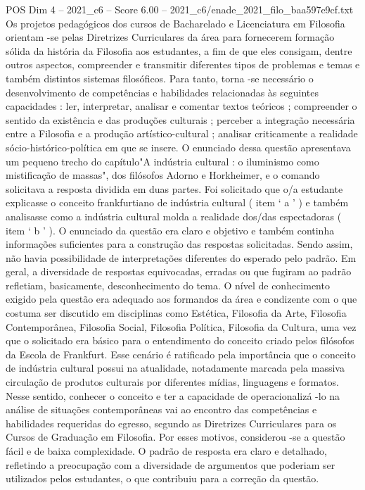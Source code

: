 \begin{textsample}{POS Dim 4 – 2021\_c6 – Score 6.00 – 2021\_c6/enade\_2021\_filo\_baa597e9cf.txt}
Os projetos pedagógicos dos cursos de Bacharelado e Licenciatura em Filosofia orientam -se pelas Diretrizes Curriculares da área para fornecerem formação sólida da história da Filosofia aos estudantes, a fim de que eles consigam, dentre outros aspectos, compreender e transmitir diferentes tipos de problemas e temas e também distintos sistemas filosóficos.
Para tanto, torna -se necessário o desenvolvimento de competências e habilidades relacionadas às seguintes capacidades : ler, interpretar, analisar e comentar textos teóricos ; compreender o sentido da existência e das produções culturais ; perceber a integração necessária entre a Filosofia e a produção artístico-cultural ; analisar criticamente a realidade sócio-histórico-política em que se insere.
O enunciado dessa questão apresentava um pequeno trecho do capítulo"A indústria cultural : o iluminismo como mistificação de massas", dos filósofos Adorno e Horkheimer, e o comando solicitava a resposta dividida em duas partes.
Foi solicitado que o/a estudante explicasse o conceito frankfurtiano de indústria cultural ( item ‘ a ’ ) e também analisasse como a indústria cultural molda a realidade dos/das espectadoras ( item ‘ b ’ ).
O enunciado da questão era claro e objetivo e também continha informações suficientes para a construção das respostas solicitadas.
Sendo assim, não havia possibilidade de interpretações diferentes do esperado pelo padrão.
Em geral, a diversidade de respostas equivocadas, erradas ou que fugiram ao padrão refletiam, basicamente, desconhecimento do tema.
O nível de conhecimento exigido pela questão era adequado aos formandos da área e condizente com o que costuma ser discutido em disciplinas como Estética, Filosofia da Arte, Filosofia Contemporânea, Filosofia Social, Filosofia Política, Filosofia da Cultura, uma vez que o solicitado era básico para o entendimento do conceito criado pelos filósofos da Escola de Frankfurt.
Esse cenário é ratificado pela importância que o conceito de indústria cultural possui na atualidade, notadamente marcada pela massiva circulação de produtos culturais por diferentes mídias, linguagens e formatos.
Nesse sentido, conhecer o conceito e ter a capacidade de operacionalizá -lo na análise de situações contemporâneas vai ao encontro das competências e habilidades requeridas do egresso, segundo as Diretrizes Curriculares para os Cursos de Graduação em Filosofia.
Por esses motivos, considerou -se a questão fácil e de baixa complexidade.
O padrão de resposta era claro e detalhado, refletindo a preocupação com a diversidade de argumentos que poderiam ser utilizados pelos estudantes, o que contribuiu para a correção da questão.

\end{textsample}
